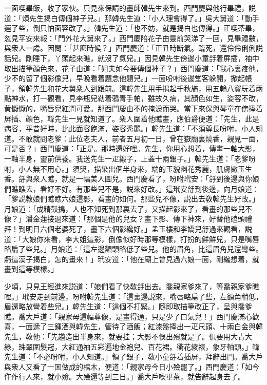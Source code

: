一面喫畢飯，收了家伙。只見來保請的畫師韓先生來到。西門慶與他行畢禮，説道：「煩先生揭白傳個神子兒。」那韓先生道：「小人理會得了。」吳大舅道：「動手遲了些，倒只怕面容改了。」韓先生道：「也不妨，就是揭白也傳得。」正喫茶畢，忽見平安來報：「門外花大舅來了。」西門慶陪花子由靈前哭涕了一回，見畢禮數，與衆人一䖏。因問：「甚麽時候？」西門慶道：「正丑時断氣。臨死，還伶伶俐俐説話兒。剛睡下，丫頭起來瞧，就沒了氣兒。」因見韓先生傍邊小童㧱着屏插，袖中取出描筆顔色來，花子由道：「姐夫如今要傳個神子？」西門慶道：「我心裏疼他，少不的留了個影像兒，早晚看着題念他題兒。」一面吩咐後邊堂客躲開，掀起帳子，領韓先生和花大舅衆人到跟前。這韓先生用手揭起千秋旛，用五輪八寳玩着兩點神水，打一觀看，見李瓶兒勒着鴉青手帕，雖故久病，其顔色如生，姿容不改，黄懨懨的，嘴唇兒紅潤可愛。那西門慶由不的掩淚而哭。當下來保與琴童在傍捧着屏插、顔色，韓先生一見就知道了。衆人圍着他瞧畫，應伯爵便道：「先生，此是病容，平昔好時，比此面容飽滿，姿容秀麗。」韓先生道：「不須尊長吩咐，小人知道。不敢就問老爹：此位老夫人，前者五月初一日，曾在嶽廟裏燒香，親見一面，可是否？」西門慶道：「正是。那時還好哩。先生，你用心想着，傳畫一軸大影，一軸半身，靈前供養。我送先生一疋緞子，上蓋十兩銀子。」韓先生道：「老爹吩咐，小人無不用心。」須臾，描染出個半身來，端的玉貌幽花秀麗，肌膚嫩玉生香。㧱與衆人瞧，就是一幅美人圖兒。西門慶看了，吩咐玳安：「㧱到後邊與你娘們瞧瞧去，看好不好。有那些兒不是，説來好改。」這玳安㧱到後邊，向月娘道：「爹説教娘們瞧瞧六娘這影，看畫的如何。那些兒不像，説出去敎韓先生好改。」月娘道：「成精鼓搗，人也不知死到那裏去了，又描起影來了，看畫的那些兒不像？」潘金蓮接過來道：「那個是他的兒女？畫下影、傳下神來，好替他磕頭禮拜！到明日六個老婆死了，畫下六個影纔好。」孟玉樓和李嬌兒㧱過來觀看，説道：「大娘你來看，李大姐這影，倒像似好時那等模樣，打扮的鮮鮮兒，只是嘴唇略扁了些兒。」月娘道：「這左邊額頭略低了些兒。他的眉角，比這眉角兒還彎些。虧這漢子揭白，怎的畫來！」玳安道：「他在廟上曾見過六娘一面，剛纔想着，就畫到這等模樣。」

少頃，只見王經進來説道：「娘們看了快敎㧱出去。喬親家爹來了，等喬親家爹瞧哩。」玳安走到前邊，吩咐韓先生道：「這裏邊説來，嘴唇略扁了些，左額角稍低，眉還略放彎着些兒。」韓先生道：「這個不打緊。」隨即取描筆改正了，呈與喬爹瞧。喬大戶道：「親家母這幅尊像，是畫得通，只是少了口氣兒！」西門慶滿心歡喜，一面遞了三鍾酒與韓先生，管待了酒飯；紅漆盤捧出一疋尺頭、十兩白金與韓先生，敎他：「先趲造出半身來，就要挂；大影不悞出殯就是了。俱要用大青大綠，珠翠圍髮冠，大紅通袖五彩遍地金袍兒、百花裙。衢花綾裱，象牙軸頭。」韓先生道：「不必吩咐，小人知道。」領了銀子，敎小童㧱着插屏，拜辭出門。喬大戶與衆人又看了一囬做成的棺木，便道：「親家母今日小殮罷了。」西門慶道：「如今仵作行人來，就小殮。大殮還等到三日。」喬大戶喫畢茶，就告辭起身去了。

